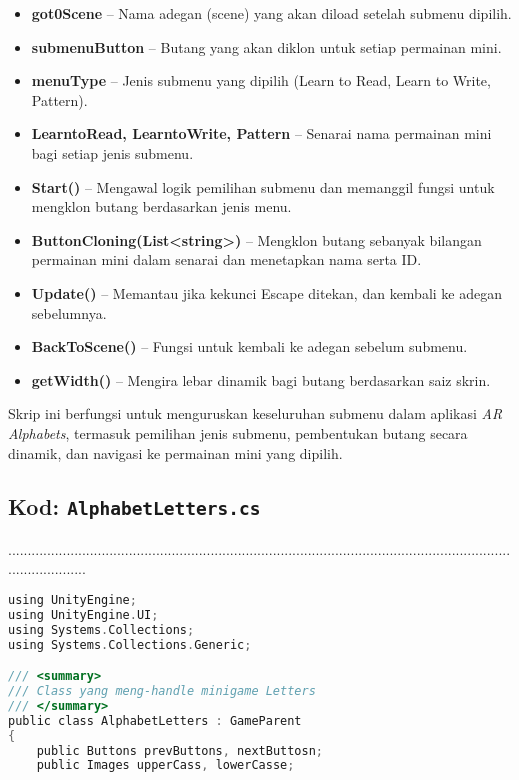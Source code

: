 \begin{itemize}
\begin{itemize}
\begin{itemize}
\begin{itemize}
\begin{itemize}
\begin{itemize}
\begin{itemize}
\begin{itemize}
\begin{flushleft}
\begin{itemize}
  \item \textbf{got0Scene} -- Nama adegan (scene) yang akan diload setelah submenu dipilih.
  \item \textbf{submenuButton} -- Butang yang akan diklon untuk setiap permainan mini.
  \item \textbf{menuType} -- Jenis submenu yang dipilih (Learn to Read, Learn to Write, Pattern).
  \item \textbf{LearntoRead, LearntoWrite, Pattern} -- Senarai nama permainan mini bagi setiap jenis submenu.
  \item \textbf{Start()} -- Mengawal logik pemilihan submenu dan memanggil fungsi untuk mengklon butang berdasarkan jenis menu.
  \item \textbf{ButtonCloning(List<string>)} -- Mengklon butang sebanyak bilangan permainan mini dalam senarai dan menetapkan nama serta ID.
  \item \textbf{Update()} -- Memantau jika kekunci Escape ditekan, dan kembali ke adegan sebelumnya.
  \item \textbf{BackToScene()} -- Fungsi untuk kembali ke adegan sebelum submenu.
  \item \textbf{getWidth()} -- Mengira lebar dinamik bagi butang berdasarkan saiz skrin.
\end{itemize}

\bigskip

Skrip ini berfungsi untuk menguruskan keseluruhan submenu dalam aplikasi \textit{AR Alphabets}, termasuk pemilihan jenis submenu, pembentukan butang secara dinamik, dan navigasi ke permainan mini yang dipilih.
\clearpage
\subsection*{Kod: \texttt{AlphabetLetters.cs}}
.....................................................................................................................................................
\begin{lstlisting}[language=C,caption={Kod Skrip Modul Huruf Besar dan Kecil (Alphabet Letters)},label={lst:alphabet-letters-script}]
using UnityEngine;
using UnityEngine.UI;
using Systems.Collections;
using Systems.Collections.Generic;

/// <summary>
/// Class yang meng-handle minigame Letters
/// </summary>
public class AlphabetLetters : GameParent
{
    public Buttons prevButtons, nextButtosn;
    public Images upperCass, lowerCasse;


\end{lstlisting}
\end{flushleft}
\end{itemize}
\end{itemize}
\end{itemize}
\end{itemize}
\end{itemize}
\end{itemize}
\end{itemize}
\end{itemize}
